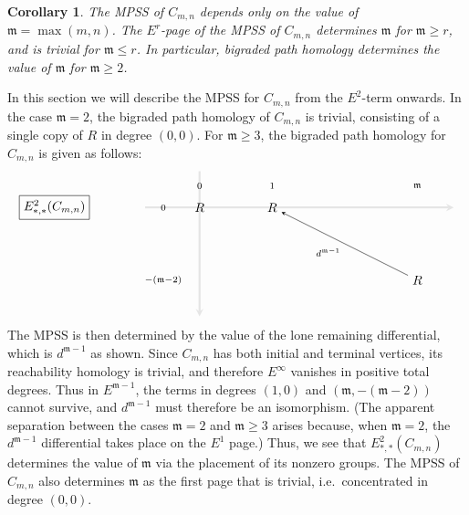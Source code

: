 \documentclass[a4paper, 11 pt, oneside, reqno]{amsart}
\numberwithin{lemma}{section}
\newtheorem{corollary}[lemma]{Corollary}
\theoremstyle{definition}
\newcommand{\m}{\mathfrak{m}}
\begin{document}
\begin{corollary}
    The MPSS of $C_{m,n}$ depends only on the value of $\m=\max(m,n)$.
    The \(E^r\)-page of the MPSS of $C_{m,n}$
    determines $\m$ for \(\m \geq r\), 
    and is trivial for \(\m \leq r\). 
    In particular, bigraded path homology 
    determines the value of $\m$ for  \(\m \geq 2\).
\end{corollary}






In this section we will describe the  MPSS for $C_{m,n}$
from the $E^2$-term onwards.
In the case $\m=2$, the bigraded path homology of $C_{m,n}$ is
trivial, consisting of a single copy of $R$ in degree $(0,0)$.
For $\m\geq 3$, the bigraded path homology 
for $C_{m,n}$ is given as  follows:
\[
    \begin{tikzpicture}[baseline=0,scale=2]
        \draw[-stealth, ultra thick,white!90!black] (-0.75,0) to (3.5,0);
        \draw[-stealth, ultra thick,white!90!black] (0,0.5) to (0,-1.5);
        \node (a) at (0,0) {$R$};
        \node (b) at (1,0) {$R$};
        \node (c) at (3,-1) {$R$};
        \node() at (0,0.3) {$\scriptstyle 0$};
        \node() at (1,0.3) {$\scriptstyle 1$};
        \node() at (3,0.3) {$\scriptstyle \m$};
        \node() at (-0.5,0) {$\scriptstyle 0$};
        \node() at (-0.5,-1) {$\scriptstyle -(\m-2)$};
        \draw[-stealth] (c) to node[below left]{$\scriptstyle d^{\m-1}$} (b);
        \node[draw]() at (-2,0) {$E^2_{\ast,\ast}(C_{m,n})$};
    \end{tikzpicture}
\]
The MPSS is then determined by the value of the lone remaining
differential, which is $d^{\m-1}$ as shown.
Since $C_{m,n}$ has both initial and terminal vertices,
its reachability homology is trivial, 
and therefore $E^\infty$ vanishes in positive total degrees.
Thus in $E^{\m-1}$, the terms in degrees
$(1,0)$ and $(\m,-(\m-2))$ cannot survive, 
and $d^{\m-1}$ must therefore be an isomorphism.
(The apparent separation between the cases $\m=2$ and $\m\geq 3$
arises because, when $\m=2$, the $d^{\m-1}$ differential
takes place on the $E^1$ page.)
Thus, we see that $E^2_{\ast,\ast}(C_{m,n})$ determines
the value of $\m$ via the placement of its nonzero groups.
The MPSS of $C_{m,n}$ also determines $\m$ as the first
page that is trivial, i.e.~concentrated in degree
$(0,0)$.
\end{document}
